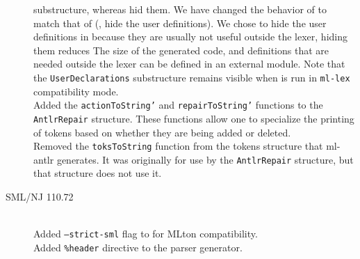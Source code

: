 \begin{description}
    substructure, whereas \mlantlr{} hid them.  We have changed the behavior of \ulex{} to match
    that of \mlantlr{} (\ie{}, hide the user definitions).  We chose to hide the user definitions
    in \ulex{} because they are usually not useful outside the lexer, hiding them reduces The
    size of the generated code, and definitions that are needed outside the lexer can be
    defined in an external module.  Note that the \texttt{UserDeclarations} substructure remains
    visible when \ulex{} is run in \texttt{ml-lex} compatibility mode.
    \\[0.5em]
    Added the \texttt{actionToString'} and \texttt{repairToString'} functions
    to the \texttt{AntlrRepair} structure.  These functions allow one to
    specialize the printing of tokens based on whether they are being added or deleted.
    \\[0.5em]
    Removed the \texttt{toksToString} function from the tokens structure that ml-antlr
    generates.  It was originally for use by the \texttt{AntlrRepair} structure, but that
    structure does not use it.
%
  \item[SML/NJ 110.72]
    \mbox{}\\[0.5em]
    Added \texttt{--strict-sml} flag to \ulex{} for MLton compatibility.
    \\[0.5em]
    Added \texttt{\%header} directive to the \mlantlr{} parser generator.
\end{description}%
